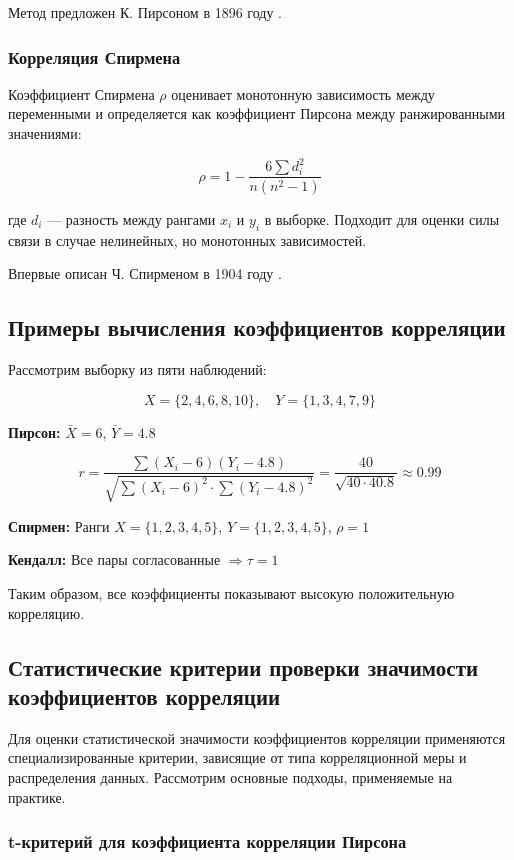 Метод предложен К. Пирсоном в 1896 году \cite{pearson1896}.

\subsubsection{Корреляция Спирмена}

Коэффициент Спирмена $\rho$ оценивает монотонную зависимость между переменными и определяется как коэффициент Пирсона между ранжированными значениями:

\[
\rho = 1 - \frac{6 \sum d_i^2}{n(n^2 - 1)}
\]

где $d_i$ — разность между рангами $x_i$ и $y_i$ в выборке. Подходит для оценки силы связи в случае нелинейных, но монотонных зависимостей.

Впервые описан Ч. Спирменом в 1904 году \cite{spearman1904}.

\subsection{Примеры вычисления коэффициентов корреляции}

Рассмотрим выборку из пяти наблюдений:

\[
X = \{2, 4, 6, 8, 10\}, \quad Y = \{1, 3, 4, 7, 9\}
\]

\textbf{Пирсон:} $\bar{X} = 6$, $\bar{Y} = 4.8$

\[
r = \frac{\sum (X_i - 6)(Y_i - 4.8)}{\sqrt{\sum (X_i - 6)^2 \cdot \sum (Y_i - 4.8)^2}} = \frac{40}{\sqrt{40 \cdot 40.8}} \approx 0.99
\]

\textbf{Спирмен:} Ранги $X = \{1,2,3,4,5\}$, $Y = \{1,2,3,4,5\}$, $\rho = 1$

\textbf{Кендалл:} Все пары согласованные $\Rightarrow \tau = 1$

Таким образом, все коэффициенты показывают высокую положительную корреляцию.


\subsection{Статистические критерии проверки значимости коэффициентов корреляции}

Для оценки статистической значимости коэффициентов корреляции применяются специализированные критерии, зависящие от типа корреляционной меры и распределения данных. Рассмотрим основные подходы, применяемые на практике.

\subsubsection{t-критерий для коэффициента корреляции Пирсона}

